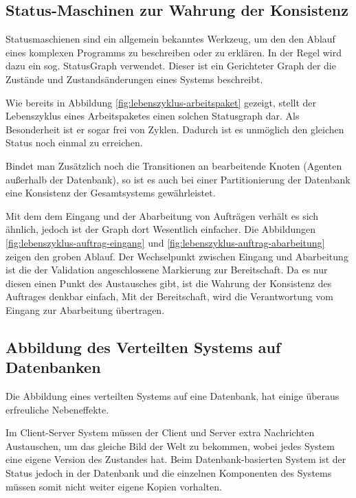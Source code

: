 

\subsection{Status-Maschinen zur Wahrung der Konsistenz}

\nocite{statechart}

Statusmaschienen sind ein allgemein bekanntes Werkzeug,
um den den Ablauf eines komplexen Programms zu beschreiben oder zu erklären.
In der Regel wird dazu ein sog. StatusGraph verwendet.
Dieser ist ein Gerichteter Graph der die Zustände und Zustandsänderungen eines Systems beschreibt.

Wie bereits in Abbildung \ref{fig:lebenszyklus-arbeitspaket} gezeigt,
stellt der Lebenszyklus eines Arbeitspaketes einen solchen Statusgraph dar.
Als Besonderheit ist er sogar frei von Zyklen.
Dadurch ist es unmöglich den gleichen Status noch einmal zu erreichen.

Bindet man Zusätzlich noch die Transitionen an bearbeitende Knoten (Agenten außerhalb der Datenbank),
so ist es auch bei einer Partitionierung der Datenbank eine Konsistenz der Gesamtsystems gewährleistet.



Mit dem dem Eingang und der Abarbeitung von Aufträgen verhält es sich ähnlich,
jedoch ist der Graph dort Wesentlich einfacher.
Die Abbildungen \ref{fig:lebenszyklus-auftrag-eingang} und \ref{fig:lebenszyklus-auftrag-abarbeitung} zeigen den groben Ablauf.
Der Wechselpunkt zwischen Eingang und Abarbeitung ist die der Validation angeschlossene Markierung zur Bereitschaft.
Da es nur diesen einen Punkt des Austausches gibt, ist die Wahrung der Konsistenz des Auftrages denkbar einfach,
Mit der Bereitschaft, wird die Verantwortung vom Eingang zur Abarbeitung übertragen.

\subsection{Abbildung des Verteilten Systems auf Datenbanken}

Die Abbildung eines verteilten Systems auf eine Datenbank,
hat einige überaus erfreuliche Nebeneffekte.

Im Client-Server System müssen der Client und Server extra Nachrichten Austauschen, um das gleiche Bild der Welt zu bekommen, wobei jedes System eine eigene Version des Zustandes hat.
Beim Datenbank-basierten System ist der Status jedoch in der Datenbank und
die einzelnen Komponenten des Systems müssen somit nicht weiter eigene Kopien vorhalten.

